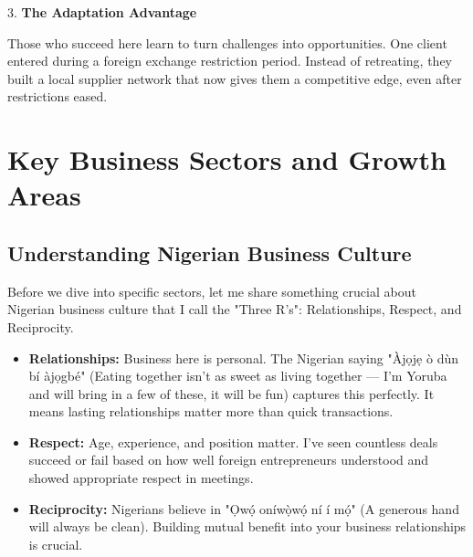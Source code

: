 3. \textbf{The Adaptation Advantage}

   Those who succeed here learn to turn challenges into opportunities. One client entered during a foreign exchange restriction period. Instead of retreating, they built a local supplier network that now gives them a competitive edge, even after restrictions eased.

\section{Key Business Sectors and Growth Areas}

\subsection{Understanding Nigerian Business Culture}
Before we dive into specific sectors, let me share something crucial about Nigerian business culture that I call the "Three R's": Relationships, Respect, and Reciprocity.

\begin{tcolorbox}[colback=white,colframe=primarydark,title=\textbf{The Three R's of Nigerian Business}]
\begin{itemize}
    \item \textbf{Relationships:} Business here is personal. The Nigerian saying "Àjọjẹ ò dùn bí àjọgbé" (Eating together isn't as sweet as living together — I'm Yoruba and will bring in a few of these, it will be fun) captures this perfectly. It means lasting relationships matter more than quick transactions.
    \item \textbf{Respect:} Age, experience, and position matter. I've seen countless deals succeed or fail based on how well foreign entrepreneurs understood and showed appropriate respect in meetings.
    \item \textbf{Reciprocity:} Nigerians believe in "Ọwọ́ oníwọ̀wọ́ ní í mọ́" (A generous hand will always be clean). Building mutual benefit into your business relationships is crucial.
\end{itemize}
\end{tcolorbox}

